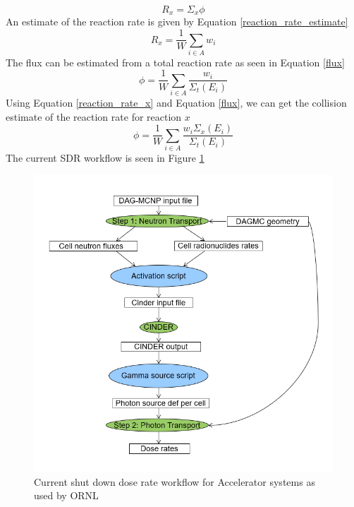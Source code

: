 \begin{equation}\label{reaction_rate_x}
  R_{x} = \Sigma_{x} \phi
\end{equation}
An estimate of the reaction rate is given by Equation \ref{reaction_rate_estimate}
\begin{equation}\label{reaction_rate_estimate}
  R_{x} = \frac{1}{W} \sum_{i \in A} w_{i}
\end{equation}
The flux can be estimated from a total reaction rate as seen in Equation
\ref{flux}
\begin{equation}\label{flux}
  \phi = \frac{1}{W} \sum_{i \in A} \frac{w_{i}}{\Sigma_{t}(E_{i})}
\end{equation}
Using Equation \ref{reaction_rate_x} and Equation \ref{flux}, we can get
the collision estimate of the reaction rate for reaction $x$
\begin{equation}\label{reaction_x_estimate}
  \phi = \frac{1}{W} \sum_{i \in A} \frac{w_{i} \Sigma_{x}(E_{i})}{\Sigma_{t}(E_{i})}
\end{equation}
The current SDR workflow is seen in Figure \ref{rnucs_r2s}
\begin{figure}[h!]
\begin{centering}
\includegraphics[scale=0.4]{../figs/rnucs_r2s.png}
\caption{Current shut down dose rate workflow for Accelerator systems as used by ORNL}
\label{rnucs_r2s}
\end{centering}
\end{figure}
\newpage
